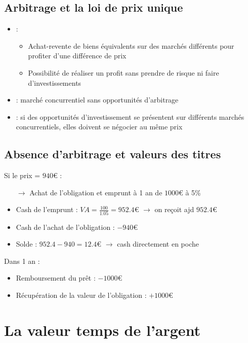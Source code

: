 \section{Arbitrage et la loi de prix unique}

\begin{itemize}
    \item {} :
    \begin{itemize}
        \item Achat-revente de biens équivalents sur des marchés différents pour profiter d'une différence de prix
        \item Possibilité de réaliser un profit sans prendre de risque ni faire d'investissements
    \end{itemize}
    \item {} : marché concurrentiel sans opportunités d'arbitrage
    \item {} : si des opportunités d'investissement se présentent sur différents marchés concurrentiels, elles doivent se négocier au même prix
\end{itemize}

\section{Absence d'arbitrage et valeurs des titres}

Si le prix = $940$€ :
\begin{itemize}
    \item[$\rightarrow$] Achat de l'obligation et emprunt à 1 an de $1000$€ à 5\%
    \item Cash de l'emprunt : $VA = \frac{100}{1.05} = 952.4$€ $\rightarrow$ on reçoit ajd $952.4$€
    \item Cash de l'achat de l'obligation : $-940$€
    \item Solde : $952.4 - 940 = 12.4$€ $\rightarrow$ cash directement en poche
\end{itemize}
Dans 1 an :
\begin{itemize}
    \item Remboursement du prêt : $-1000$€
    \item Récupération de la valeur de l'obligation : $+1000$€
\end{itemize}

\chapter{La valeur temps de l'argent}

